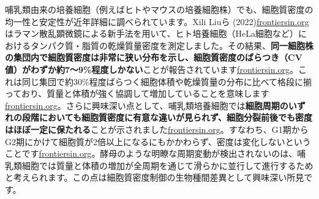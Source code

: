 哺乳類由来の培養細胞（例えばヒトやマウスの培養細胞株）でも、細胞質密度の均一性と安定性が近年詳細に調べられています。Xili Liuら (2022)\href{https://www.frontiersin.org/journals/cell-and-developmental-biology/articles/10.3389/fcell.2022.1017499/full\#:~:text=perturbations\%20in\%20three\%20cultured\%20mammalian,perturbations\%20such\%20as\%20starvation\%20or}{frontiersin.org}はラマン散乱顕微鏡による新手法を用いて、ヒト培養細胞（HeLa細胞など）におけるタンパク質・脂質の乾燥質量密度を測定しました。その結果、\textbf{同一細胞株の集団内で細胞質密度は非常に狭い分布を示し、細胞質密度のばらつき（CV値）がわずか約7〜9\%程度しかない}ことが報告されています\href{https://www.frontiersin.org/journals/cell-and-developmental-biology/articles/10.3389/fcell.2022.1017499/full\#:~:text=match\%20at\%20L637\%20observed\%20CV,cell\%20volume\%20in\%20individual\%20cells}{frontiersin.org}。これは同じ集団で約30\%程度ばらつく細胞体積や乾燥質量の分布に比べて格段に揃っており、質量と体積が強く協調して増加していることを意味します\href{https://www.frontiersin.org/journals/cell-and-developmental-biology/articles/10.3389/fcell.2022.1017499/full\#:~:text=population\%2C\%20as\%20quantified\%20in\%20terms,However\%2C\%20the}{frontiersin.org}。さらに興味深い点として、哺乳類培養細胞では\textbf{細胞周期のいずれの段階においても細胞質密度に有意な違いが見られず、細胞分裂前後でも密度はほぼ一定に保たれる}ことが示されました\href{https://www.frontiersin.org/journals/cell-and-developmental-biology/articles/10.3389/fcell.2022.1017499/full\#:~:text=perturbations\%20in\%20three\%20cultured\%20mammalian,mass\%20density\%20when\%20mass\%20is}{frontiersin.org}。すなわち、G1期からG2期にかけて細胞質が2倍以上になるにもかかわらず、密度は変化しないということです\href{https://www.frontiersin.org/journals/cell-and-developmental-biology/articles/10.3389/fcell.2022.1017499/full\#:~:text=narrow\%20mass\%20density\%20distribution\%20within,resistant\%20to\%20pharmacological\%20perturbations\%20of}{frontiersin.org}。酵母のような明瞭な周期変動が検出されないのは、哺乳類細胞では質量と体積の増加が全周期を通じて滑らかに並行して進行するためと考えられます。この点は細胞質密度制御の生物種間差異として興味深い所見です。

